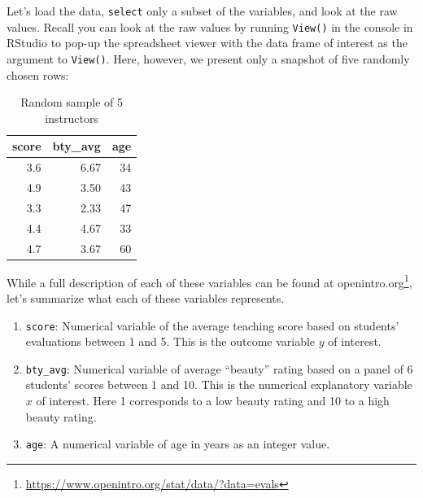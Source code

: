\documentclass[12pt,]{krantz}
\makeatletter
\newenvironment{Shaded}{\begin{snugshade}}{\end{snugshade}}
\newcommand{\KeywordTok}[1]{\textcolor[rgb]{0.27,0.27,0.27}{\textbf{#1}}}
\newcommand{\DecValTok}[1]{\textcolor[rgb]{0.06,0.06,0.06}{#1}}
\newcommand{\StringTok}[1]{\textcolor[rgb]{0.5,0.5,0.5}{#1}}
\newcommand{\OperatorTok}[1]{\textcolor[rgb]{0.43,0.43,0.43}{\textbf{#1}}}
\newcommand{\NormalTok}[1]{#1}
\providecommand{\tightlist}{%
  \setlength{\itemsep}{0pt}\setlength{\parskip}{0pt}}
\renewcommand{\href}[2]{#2\footnote{\url{#1}}}
\newenvironment{kframe}{%
\medskip{}
\setlength{\fboxsep}{.8em}
 \def\at@end@of@kframe{}%
 \ifinner\ifhmode%
  \def\at@end@of@kframe{\end{minipage}}%
  \begin{minipage}{\columnwidth}%
 \fi\fi%
 \def\FrameCommand##1{\hskip\@totalleftmargin \hskip-\fboxsep
 \colorbox{shadecolor}{##1}\hskip-\fboxsep
     \hskip-\linewidth \hskip-\@totalleftmargin \hskip\columnwidth}%
 \MakeFramed {\advance\hsize-\width
   \@totalleftmargin\z@ \linewidth\hsize
   \@setminipage}}%
 {\par\unskip\endMakeFramed%
 \at@end@of@kframe}
\renewenvironment{Shaded}{\begin{kframe}}{\end{kframe}}
\theoremstyle{definition}
\theoremstyle{definition}
\theoremstyle{definition}
\theoremstyle{remark}
\makeatother
\begin{document}
Let's load the data, \texttt{select} only a subset of the variables, and
look at the raw values. Recall you can look at the raw values by running
\texttt{View()} in the console in RStudio to pop-up the spreadsheet
viewer with the data frame of interest as the argument to
\texttt{View()}. Here, however, we present only a snapshot of five
randomly chosen rows:

\begin{Shaded}
\end{Shaded}

\begin{Shaded}
\end{Shaded}

\begin{table}[H]

\caption{\label{tab:unnamed-chunk-165}Random sample of 5 instructors}
\centering
\fontsize{10}{12}\selectfont
\begin{tabular}[t]{rrr}
\toprule
score & bty\_avg & age\\
\midrule
3.6 & 6.67 & 34\\
4.9 & 3.50 & 43\\
3.3 & 2.33 & 47\\
4.4 & 4.67 & 33\\
4.7 & 3.67 & 60\\
\bottomrule
\end{tabular}
\end{table}

While a full description of each of these variables can be found at
\href{https://www.openintro.org/stat/data/?data=evals}{openintro.org},
let's summarize what each of these variables represents.

\begin{enumerate}
\def\labelenumi{\arabic{enumi}.}
\tightlist
\item
  \texttt{score}: Numerical variable of the average teaching score based
  on students' evaluations between 1 and 5. This is the outcome variable
  \(y\) of interest.
\item
  \texttt{bty\_avg}: Numerical variable of average ``beauty'' rating
  based on a panel of 6 students' scores between 1 and 10. This is the
  numerical explanatory variable \(x\) of interest. Here 1 corresponds
  to a low beauty rating and 10 to a high beauty rating.
\item
  \texttt{age}: A numerical variable of age in years as an integer
  value.
\end{enumerate}
\end{document}
